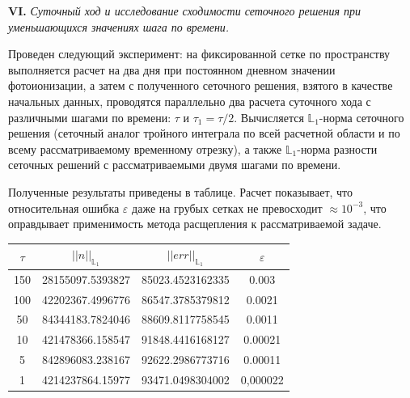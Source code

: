 \documentclass[2pt, a4paper, fleqn]{extarticle}
\begin{document}
\newpage

{\bf VI.} \textit{Суточный ход и исследование сходимости сеточного решения при уменьшающихся значениях шага по времени.}

Проведен следующий эксперимент: на фиксированной сетке по пространству выполняется расчет на два дня при постоянном дневном значении фотоионизации, а затем с полученного сеточного решения, взятого в качестве начальных данных, проводятся параллельно два расчета суточного хода с различными шагами по времени: $\tau$ и $\tau_1 = \tau/2$. Вычисляется $\mathbb{L}_1$-норма сеточного решения (сеточный аналог тройного интеграла по всей расчетной области и по всему рассматриваемому временному отрезку), а также $\mathbb{L}_1$-норма разности сеточных решений с рассматриваемыми двумя шагами по времени.

Полученные результаты приведены в таблице. Расчет показывает, что относительная ошибка $\varepsilon$ даже на грубых сетках не превосходит $\approx 10^{-3}$, что оправдывает применимость метода расщепления к рассматриваемой задаче.

\smallskip

\begin{center}
\begin{tabular}{|c|c|c|c|}
\hline
$\tau$&$||n||_{\mathbb{L}_1}$&$||err||_{\mathbb{L}_1}$&$\varepsilon$\\
\hline
150&28155097.5393827&85023.4523162335&0.003\\
\hline
100&42202367.4996776&86547.3785379812&0.0021\\
\hline
50&84344183.7824046&88609.8117758545&0.0011\\
\hline
10&421478366.158547&91848.4416168127&0.00021\\
\hline
5&842896083.238167&92622.2986773716&0.00011\\
\hline
1&4214237864.15977&93471.0498304002&0,000022\\
\hline
\end{tabular}
\end{center}
\end{document}
